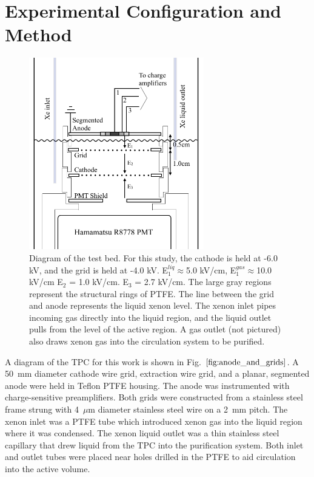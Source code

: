 \section{Experimental Configuration and Method}
\begin{figure}[ht]
    \centering
    \includegraphics[width=3.0in]{figures/radon/internals.png}
    \caption{Diagram of the test bed. For this study, the cathode is held at -6.0 kV, and the grid is held at -4.0 kV. E$_{1}^{liq} \approx $5.0 kV/cm, E$_{1}^{gas} \approx $10.0 kV/cm E$_{2}$ = 1.0 kV/cm. E$_{3}$ = 2.7 kV/cm. The large gray regions represent the structural rings of PTFE. The line between the grid and anode represents the liquid xenon level. The xenon inlet pipes incoming gas directly into the liquid region, and the liquid outlet pulls from the level of the active region. A gas outlet (not pictured) also draws xenon gas into the circulation system to be purified.}
    \label{fig:anode_and_grids}
\end{figure}

A diagram of the TPC for this work is shown in Fig. $\ref{fig:anode_and_grids}$. A 50~mm diameter cathode wire grid, extraction wire grid, and a planar, segmented anode were held in Teflon PTFE housing. The anode was instrumented with charge-sensitive preamplifiers. Both grids were constructed from a stainless steel frame strung with 4~$\mu$m diameter stainless steel wire on a 2~mm pitch. The xenon inlet was a PTFE tube which introduced xenon gas into the liquid region where it was condensed. The xenon liquid outlet was a thin stainless steel capillary that drew liquid from the TPC into the purification system. Both inlet and outlet tubes were placed near holes drilled in the PTFE to aid circulation into the active volume.

